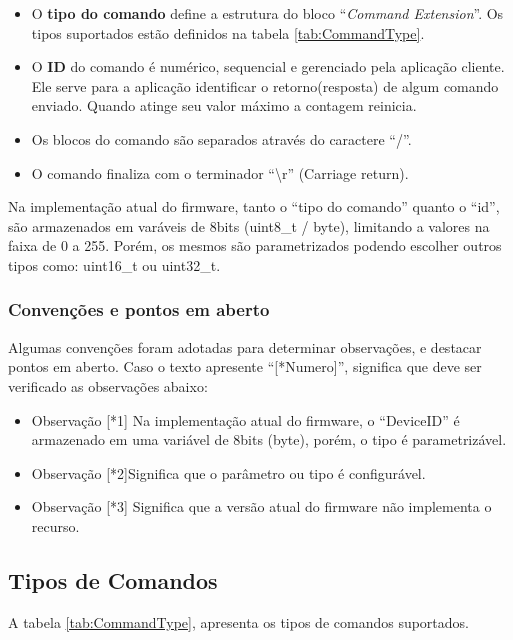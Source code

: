 \begin{itemize}
\item O \textbf{tipo do comando} define a estrutura do bloco ``\emph{Command
Extension}''. Os tipos suportados estão definidos na tabela \ref{tab:CommandType}. 
\item O \textbf{ID} do comando é numérico, sequencial e gerenciado pela
aplicação cliente. Ele serve para a aplicação identificar o retorno(resposta)
de algum comando enviado. Quando atinge seu valor máximo a contagem
reinicia.
\item Os blocos do comando são separados através do caractere ``/''.
\item O comando finaliza com o terminador ``\textbackslash{}r'' (Carriage
return).
\end{itemize}
 Na implementação atual do firmware, tanto o ``tipo
do comando'' quanto o ``id'', são armazenados em varáveis de 8bits
(uint8\_t / byte), limitando a valores na faixa de 0 a 255. Porém,
os mesmos são parametrizados podendo escolher outros tipos como: uint16\_t
ou uint32\_t.

\subsubsection{Convenções e pontos em aberto}

Algumas convenções foram adotadas para determinar observações, e destacar
pontos em aberto. Caso o texto apresente ``{[}{*}Numero{]}'', significa
que deve ser verificado as observações abaixo:
\begin{itemize}
\item Observação {[}{*}1{]}\noun{:} Na implementação atual do firmware,
o ``DeviceID'' é armazenado em uma variável de 8bits (byte), porém,
o tipo é parametrizável.
\item Observação {[}{*}2{]}\noun{: }Significa que o parâmetro ou tipo é
configurável. 
\item Observação {[}{*}3{]}\noun{:} Significa que a versão atual do firmware
não implementa o recurso.
\end{itemize}

\subsection{Tipos de Comandos}

A tabela \ref{tab:CommandType}, apresenta os tipos de comandos suportados.


